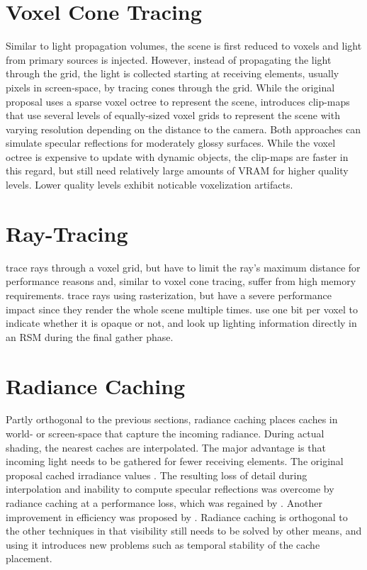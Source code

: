 \section{Voxel Cone Tracing}

Similar to light propagation volumes, the scene is first reduced to voxels and light from primary sources is injected. However, instead of propagating the light through the grid, the light is collected starting at receiving elements, usually pixels in screen-space, by tracing cones through the grid.
While the original proposal \citep{Crassin:2012:OctreeVCT} uses a sparse voxel octree to represent the scene, \citet{Panteleev:2015:VXGI} introduces clip-maps that use several levels of equally-sized voxel grids to represent the scene with varying resolution depending on the distance to the camera.
Both approaches can simulate specular reflections for moderately glossy surfaces. While the voxel octree is expensive to update with dynamic objects, the clip-maps are faster in this regard, but still need relatively large amounts of VRAM for higher quality levels. Lower quality levels exhibit noticable voxelization artifacts.


\section{Ray-Tracing}

\citet{Thiedemann:2011:VGI} trace rays through a voxel grid, but have to limit the ray's maximum distance for performance reasons and, similar to voxel cone tracing, suffer from high memory requirements. \citet{Tokuyoshi:2012:pathtracingrasterization} trace rays using rasterization, but have a severe performance impact since they render the whole scene multiple times.
\citet{Chen:2016:Compactvoxels} use one bit per voxel to indicate whether it is opaque or not, and look up lighting information directly in an RSM during the final gather phase.


\section{Radiance Caching}

Partly orthogonal to the previous sections, radiance caching places caches in world- or screen-space that capture the incoming radiance. During actual shading, the nearest caches are interpolated. The major advantage is that incoming light needs to be gathered for fewer receiving elements.
The original proposal cached irradiance values \citep{Ward:1988:IrradianceCaching}. The resulting loss of detail during interpolation and inability to compute specular reflections was overcome by radiance caching \citep{Krivanek:2005:RadianceCaching} at a performance loss, which was regained by \citet{Scherzer:2012:PreconvolvedRadianceCaching}. Another improvement in efficiency was proposed by \citet{Rehfeld:2014:ClusteredPreconvolvedRadianceCaching}.
Radiance caching is orthogonal to the other techniques in that visibility still needs to be solved by other means, and using it introduces new problems such as temporal stability of the cache placement.


